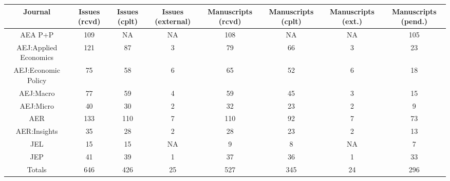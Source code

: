 
\begin{tabular}{@{\extracolsep{5pt}} cccccccc} 
\toprule 
Journal & Issues (rcvd) & Issues (cplt) & Issues (external) & Manuscripts (rcvd) & Manuscripts (cplt) & Manuscripts (ext.) & Manuscripts (pend.) \\ 
\midrule AEA P+P & 109 & NA & NA & 108 & NA & NA & 105 \\ 
AEJ:Applied Economics & 121 & 87 & 3 & 79 & 66 & 3 & 23 \\ 
AEJ:Economic Policy & 75 & 58 & 6 & 65 & 52 & 6 & 18 \\ 
AEJ:Macro & 77 & 59 & 4 & 59 & 45 & 3 & 15 \\ 
AEJ:Micro & 40 & 30 & 2 & 32 & 23 & 2 & 9 \\ 
AER & 133 & 110 & 7 & 110 & 92 & 7 & 73 \\ 
AER:Insights & 35 & 28 & 2 & 28 & 23 & 2 & 13 \\ 
JEL & 15 & 15 & NA & 9 & 8 & NA & 7 \\ 
JEP & 41 & 39 & 1 & 37 & 36 & 1 & 33 \\ 
Totals & 646 & 426 & 25 & 527 & 345 & 24 & 296 \\ 
\bottomrule 
\end{tabular} 
